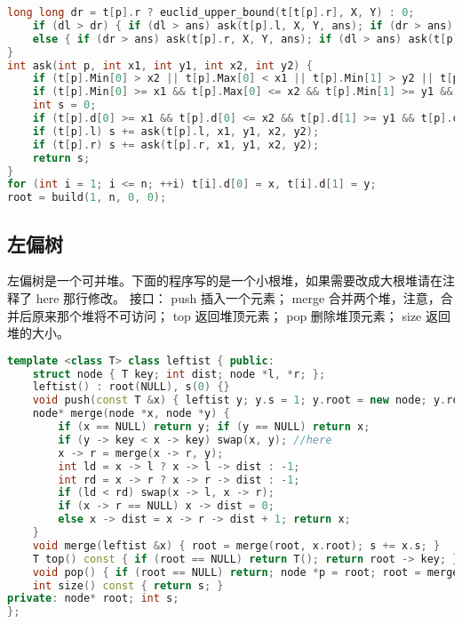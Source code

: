 \documentclass[landscape,a4paper]{article}
\begin{document}
\begin{lstlisting}[language=C++]
	long long dr = t[p].r ? euclid_upper_bound(t[t[p].r], X, Y) : 0;
	if (dl > dr) { if (dl > ans) ask(t[p].l, X, Y, ans); if (dr > ans) ask(t[p].r, X, Y, ans); }
	else { if (dr > ans) ask(t[p].r, X, Y, ans); if (dl > ans) ask(t[p].l, X, Y, ans); }
}
int ask(int p, int x1, int y1, int x2, int y2) {
	if (t[p].Min[0] > x2 || t[p].Max[0] < x1 || t[p].Min[1] > y2 || t[p].Max[1] < y1) return 0;
	if (t[p].Min[0] >= x1 && t[p].Max[0] <= x2 && t[p].Min[1] >= y1 && t[p].Max[1] <= y2) return t[p].sum;
	int s = 0;
	if (t[p].d[0] >= x1 && t[p].d[0] <= x2 && t[p].d[1] >= y1 && t[p].d[1] <= y2) s += t[p].val;
	if (t[p].l) s += ask(t[p].l, x1, y1, x2, y2);
	if (t[p].r) s += ask(t[p].r, x1, y1, x2, y2);
	return s;
}
for (int i = 1; i <= n; ++i) t[i].d[0] = x, t[i].d[1] = y;
root = build(1, n, 0, 0);
\end{lstlisting}

\subsection{左偏树}

左偏树是一个可并堆。下面的程序写的是一个小根堆，如果需要改成大根堆请在注释了 here 那行修改。
接口：
 push 插入一个元素；
 merge 合并两个堆，注意，合并后原来那个堆将不可访问；
 top 返回堆顶元素；
 pop 删除堆顶元素；
 size 返回堆的大小。

\begin{lstlisting}[language=C++]
template <class T> class leftist { public:
	struct node { T key; int dist; node *l, *r; };
	leftist() : root(NULL), s(0) {}
	void push(const T &x) { leftist y; y.s = 1; y.root = new node; y.root -> key = x; y.root -> dist = 0; y.root -> l = y.root -> r = NULL; merge(y); }
	node* merge(node *x, node *y) {
		if (x == NULL) return y; if (y == NULL) return x;
		if (y -> key < x -> key) swap(x, y); //here
		x -> r = merge(x -> r, y);
		int ld = x -> l ? x -> l -> dist : -1;
		int rd = x -> r ? x -> r -> dist : -1;
		if (ld < rd) swap(x -> l, x -> r);
		if (x -> r == NULL) x -> dist = 0;
		else x -> dist = x -> r -> dist + 1; return x;
	}
	void merge(leftist &x) { root = merge(root, x.root); s += x.s; }
	T top() const { if (root == NULL) return T(); return root -> key; }
	void pop() { if (root == NULL) return; node *p = root; root = merge(root -> l, root -> r); --s; delete p; }
	int size() const { return s; }
private: node* root; int s;
};
\end{lstlisting}
\end{document}
